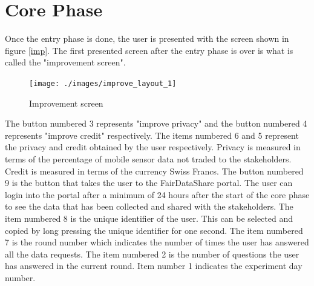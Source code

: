 \section{Core Phase} \label{core}

Once the entry phase is done, the user is presented with the screen shown in figure \ref{imp}. The first presented screen after the entry phase is over is what is called the "improvement screen". 

\begin{figure}[ht!]
\centering
\texttt{[image: ./images/improve\_layout\_1]}
\caption{Improvement screen \label{fig:imp}}
\end{figure}

The button numbered 3
represents "improve privacy" and the button numbered 4 represents "improve credit" respectively. The items numbered 6 and 5 represent the privacy  and credit obtained by the user respectively. Privacy is measured in terms of the percentage of mobile sensor data not traded to the stakeholders. Credit is measured in terms of the currency Swiss Francs. The button numbered 9 is the button that takes the user to the FairDataShare portal. The user can  login into the portal after a minimum of 24 hours after the start of the core phase to see the data that has been collected and shared with the stakeholders. The item numbered 8 is the unique identifier of the user. This can be selected and copied by long pressing the unique identifier for one second. The item numbered 7 is the round number which indicates the number of times the user has answered all the data requests. The item numbered 2 is the number of questions the user has answered in the current round. Item number 1 indicates the experiment day number.



